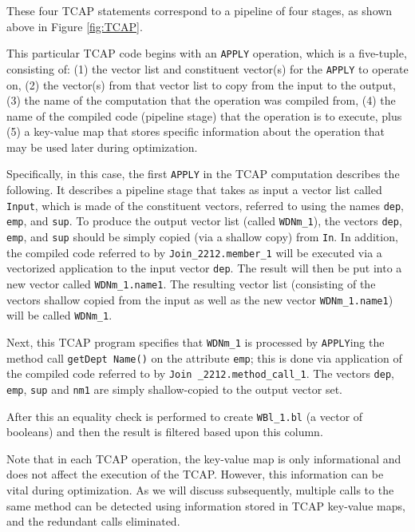 \noindent
These four TCAP statements correspond to a pipeline of four stages,
as shown above in Figure \ref{fig:TCAP}.

This particular TCAP code begins with an \texttt{APPLY} operation, which is a five-tuple, consisting of: (1) the vector list and constituent
vector(s) for the \texttt{APPLY} to operate on, (2) the vector(s) from that vector list to copy
from the input to the output, (3) the name of the computation that the operation was compiled from, (4) the name of the compiled code (pipeline stage)
that the operation is to execute, plus (5) a key-value map that stores specific information about the operation that may be used 
later during optimization.

Specifically, in this case, the first \texttt{APPLY} in the TCAP computation describes the following.  It describes a pipeline stage that
takes as input 
a vector list called \texttt{Input}, which is made of the constituent vectors, referred to using 
the names \texttt{dep}, \texttt{emp}, and \texttt{sup}.
To produce the output vector list (called \texttt{WDNm\_1}), the vectors
\texttt{dep}, \texttt{emp}, and \texttt{sup} should be simply copied (via a shallow copy) from \texttt{In}.
In addition, the compiled code referred to by \texttt{Join\_2212.member\_1} will be executed via a vectorized application to the input
vector \texttt{dep}.  The result will then be put into a new vector called 
\texttt{WDNm\_1.name1}.
The resulting vector list (consisting of the vectors shallow copied from the input as well as the new vector \texttt{WDNm\_1.name1})
will be called \texttt{WDNm\_1}.  

Next, this TCAP program
specifies that \texttt{WDNm\_1} is processed by \texttt{APPLY}ing the
method call \texttt{getDept Name()} on the attribute \texttt{emp}; this is 
done via application of the compiled code referred to by \texttt{Join
  \_2212.method\_call\_1}.  
The vectors \texttt{dep}, \texttt{emp}, \texttt{sup}
and \texttt{nm1} are simply shallow-copied to the output vector set.

After this an equality check is performed to create \texttt{WBl\_1.bl}
(a vector of booleans) and then the result is filtered based upon this
column.


Note that in each TCAP operation, the key-value map is only informational and does not affect the execution of the TCAP.  However, this
information can be vital during optimization.  As we will discuss subsequently, 
multiple calls to the same method can be detected using information stored in TCAP key-value maps, and the redundant calls eliminated.

